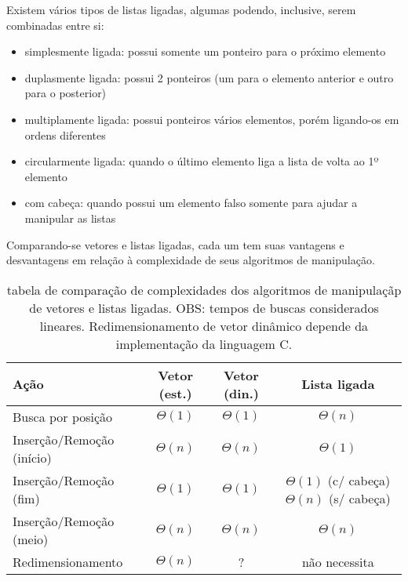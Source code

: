 Existem vários tipos de listas ligadas, algumas podendo, inclusive, serem combinadas
entre si:

\begin{itemize}
    \item simplesmente ligada: possui somente um ponteiro para o próximo elemento
    \item duplasmente ligada: possui 2 ponteiros (um para o elemento anterior e outro
        para o posterior)
    \item multiplamente ligada: possui ponteiros vários elementos, porém ligando-os em
        ordens diferentes
    \item circularmente ligada: quando o último elemento liga a lista de volta ao
        1º elemento
    \item com cabeça: quando possui um elemento falso somente para ajudar a manipular as
        listas
\end{itemize}


Comparando-se vetores e listas ligadas, cada um tem suas vantagens e desvantagens em
relação à complexidade de seus algoritmos de manipulação.

\newpage
\begin{table}
    \centering
    \begin{tabular}{| l | c | c | c |}
        \hline
        \textbf{Ação} & \textbf{Vetor (est.)} & \textbf{Vetor (din.)} & \textbf{Lista ligada} \\
        \hline
        Busca por posição & $\Theta(1)$ & $\Theta(1)$ & $\Theta(n)$ \\
        \hline
        Inserção/Remoção (início) & $\Theta(n)$ & $\Theta(n)$ & $\Theta(1)$ \\
        \hline
        Inserção/Remoção (fim) & $\Theta(1)$ & $\Theta(1)$ & \parbox[t]{.3\textwidth}{\centering $\Theta(1)$ (c/ cabeça) \\ $\Theta(n)$ (s/ cabeça)} \\
        \hline
        Inserção/Remoção (meio) & $\Theta(n)$ & $\Theta(n)$ & $\Theta(n)$ \\
        \hline
        Redimensionamento & $\Theta(n)$ & ? & não necessita \\
        \hline
    \end{tabular}
    \caption{tabela de comparação de complexidades dos algoritmos de manipulaçãp de
    vetores e listas ligadas. OBS: tempos de buscas considerados lineares.
    Redimensionamento de vetor dinâmico depende da implementação da linguagem C.}
\end{table}